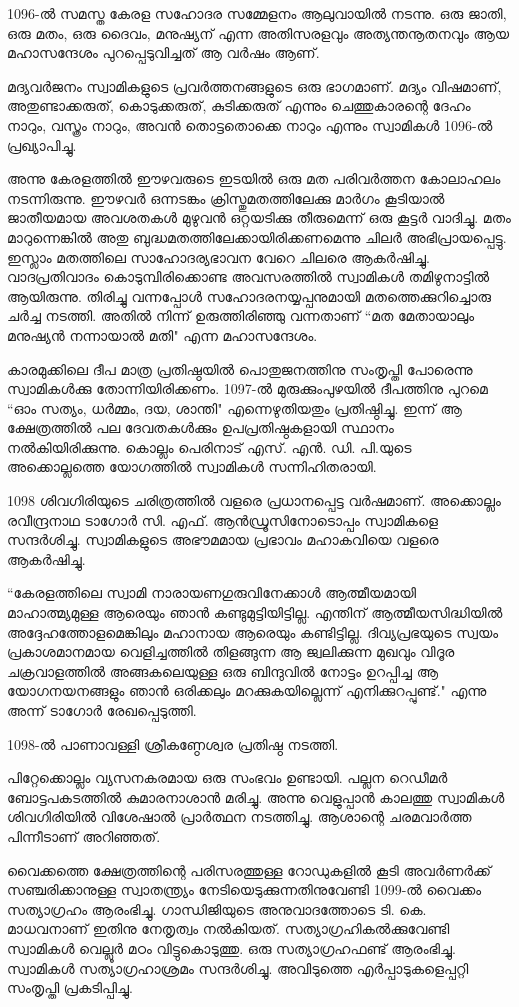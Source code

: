 \documentclass[12pt,openany]{book}
\begin{document}
	1096-ൽ സമസ്ത കേരള സഹോദര സമ്മേളനം ആലുവായിൽ നടന്നു. ഒരു ജാതി, ഒരു മതം, ഒരു ദൈവം, മനുഷ്യന് എന്ന അതിസരളവും അത്യന്തനൂതനവും ആയ മഹാസന്ദേശം പുറപ്പെടുവിച്ചത് ആ വർഷം ആണ്.
	
	മദ്യവർജനം സ്വാമികളുടെ പ്രവർത്തനങ്ങളുടെ ഒരു ഭാഗമാണ്. മദ്യം വിഷമാണ്, അതുണ്ടാക്കരുത്, കൊടുക്കരുത്, കുടിക്കരുത് എന്നും ചെത്തുകാരന്റെ ദേഹം നാറും, വസ്ത്രം നാറും, അവൻ തൊട്ടതൊക്കെ നാറും എന്നും സ്വാമികൾ 1096-ൽ പ്രഖ്യാപിച്ചു.
	
	അന്നു കേരളത്തിൽ ഈഴവരുടെ ഇടയിൽ ഒരു മത പരിവർത്തന കോലാഹലം നടന്നിരുന്നു. ഈഴവർ ഒന്നടങ്കം ക്രിസ്തുമതത്തിലേക്കു മാർഗം കൂടിയാൽ ജാതീയമായ അവശതകൾ മുഴുവൻ ഒറ്റയടിക്കു തീരുമെന്ന് ഒരു കൂട്ടർ വാദിച്ചു. മതം മാറുന്നെങ്കിൽ അതു ബുദ്ധമതത്തിലേക്കായിരിക്കണമെന്നു ചിലർ അഭിപ്രായപ്പെട്ടു. ഇസ്ലാം മതത്തിലെ സാഹോദര്യഭാവന വേറെ ചിലരെ ആകർഷിച്ചു. വാദപ്രതിവാദം കൊടുമ്പിരിക്കൊണ്ട അവസരത്തിൽ സ്വാമികൾ തമിഴുനാട്ടിൽ ആയിരുന്നു. തിരിച്ചു വന്നപ്പോൾ സഹോദരനയ്യപ്പനുമായി മതത്തെക്കുറിച്ചൊരു ചർച്ച നടത്തി. അതിൽ നിന്ന് ഉരുത്തിരിഞ്ഞു വന്നതാണ് ``മത മേതായാലും മനുഷ്യൻ നന്നായാൽ മതി" എന്ന മഹാസന്ദേശം.
	
	കാരമുക്കിലെ ദീപ മാത്ര പ്രതിഷ്ഠയിൽ പൊതുജനത്തിനു സംതൃപ്തി പോരെന്നു സ്വാമികൾക്കു തോന്നിയിരിക്കണം. 1097-ൽ മുരുക്കുംപുഴയിൽ ദീപത്തിനു പുറമെ ``ഓം സത്യം, ധർമ്മം, ദയ, ശാന്തി" എന്നെഴുതിയതും പ്രതിഷ്ഠിച്ചു. ഇന്ന് ആ ക്ഷേത്രത്തിൽ പല ദേവതകൾക്കും ഉപപ്രതിഷ്ഠകളായി സ്ഥാനം നൽകിയിരിക്കുന്നു. കൊല്ലം പെരിനാട് എസ്. എൻ. ഡി. പി.യുടെ അക്കൊല്ലത്തെ യോഗത്തിൽ സ്വാമികൾ സന്നിഹിതരായി.
	
	1098 ശിവഗിരിയുടെ ചരിത്രത്തിൽ വളരെ പ്രധാനപ്പെട്ട വർഷമാണ്. അക്കൊല്ലം രവീന്ദ്രനാഥ ടാഗോർ സി. എഫ്. ആൻഡ്രൂസിനോടൊപ്പം സ്വാമികളെ സന്ദർശിച്ചു. സ്വാമികളുടെ അഭൗമമായ പ്രഭാവം മഹാകവിയെ വളരെ ആകർഷിച്ചു.
	
	``കേരളത്തിലെ സ്വാമി നാരായണഗുരുവിനേക്കാൾ ആത്മീയമായി മാഹാത്മ്യമുള്ള ആരെയും ഞാൻ കണ്ടുമുട്ടിയിട്ടില്ല. എന്തിന് ആത്മീയസിദ്ധിയിൽ അദ്ദേഹത്തോളമെങ്കിലും മഹാനായ ആരെയും കണ്ടിട്ടില്ല. ദിവ്യപ്രഭയുടെ സ്വയം പ്രകാശമാനമായ വെളിച്ചത്തിൽ തിളങ്ങുന്ന ആ ജ്വലിക്കുന്ന മുഖവും വിദൂര ചക്രവാളത്തിൽ അങ്ങകലെയുള്ള ഒരു ബിന്ദുവിൽ നോട്ടം ഉറപ്പിച്ച ആ യോഗനയനങ്ങളും ഞാൻ ഒരിക്കലും മറക്കുകയില്ലെന്ന് എനിക്കുറപ്പുണ്ട്." എന്നു അന്ന് ടാഗോർ രേഖപ്പെടുത്തി.
	
	1098-ൽ പാണാവള്ളി ശ്രീകണ്ഠേശ്വര പ്രതിഷ്ഠ നടത്തി.
	
	പിറ്റേക്കൊല്ലം വ്യസനകരമായ ഒരു സംഭവം ഉണ്ടായി. പല്ലന റെഡീമർ ബോട്ടപകടത്തിൽ കുമാരനാശാൻ മരിച്ചു. അന്നു വെളുപ്പാൻ കാലത്തു സ്വാമികൾ ശിവഗിരിയിൽ വിശേഷാൽ പ്രാർത്ഥന നടത്തിച്ചു. ആശാന്റെ ചരമവാർത്ത പിന്നീടാണ് അറിഞ്ഞത്.
	
	വൈക്കത്തെ ക്ഷേത്രത്തിന്റെ പരിസരത്തുള്ള റോഡുകളിൽ കൂടി അവർണർക്ക് സഞ്ചരിക്കാനുള്ള സ്വാതന്ത്ര്യം നേടിയെടുക്കുന്നതിനുവേണ്ടി 1099-ൽ വൈക്കം സത്യാഗ്രഹം ആരംഭിച്ചു. ഗാന്ധിജിയുടെ അനുവാദത്തോടെ ടി. കെ. മാധവനാണ് ഇതിനു നേതൃത്വം നൽകിയത്. സത്യാഗ്രഹികൽക്കുവേണ്ടി സ്വാമികൾ വെല്ലൂർ മഠം വിട്ടുകൊടുത്തു. ഒരു സത്യാഗ്രഹഫണ്ട് ആരംഭിച്ചു. സ്വാമികൾ സത്യാഗ്രഹാശ്രമം സന്ദർശിച്ചു. അവിടുത്തെ എർപ്പാടുകളെപ്പറ്റി സംതൃപ്തി പ്രകടിപ്പിച്ചു.
	
\end{document}
